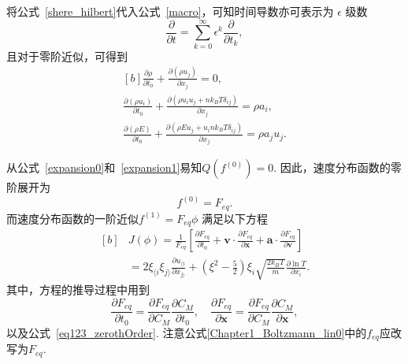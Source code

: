 将公式~\eqref{shere_hilbert}代入公式~\eqref{macro}，可知时间导数亦可表示为 $\epsilon$ 级数~\cite{henning}
\begin{equation}\label{fast_slow_time}
\frac{\partial}{\partial{} t}=\sum_{k=0}^\infty \epsilon^k \frac{\partial}{\partial{} t_k},
\end{equation}
且对于零阶近似，可得到
\begin{equation}\label{eq123_zerothOrder}
\begin{aligned}[b]
\frac{\partial \rho}{\partial t_0}+\frac{\partial(\rho{}u_j) }{\partial x_j}=0, \\
\frac{\partial (\rho{u_i})}{\partial t_0}+\frac{\partial (\rho{}u_iu_j+nk_BT\delta_{ij})}{\partial x_j}= \rho{}a_i,\\
\frac{\partial \left(\rho{}E\right)}{\partial t_0}+\frac{\partial \left(\rho{}{E}u_j+u_ink_BT\delta_{ij}\right)}{\partial x_j}=\rho{}a_ju_j.
\end{aligned}
\end{equation} 

从公式~\eqref{expansion0}和~\eqref{expansion1}易知$Q(f^{(0)})=0$. 因此，速度分布函数的零阶展开为
\begin{equation}
f^{(0)}=F_{eq}.
\end{equation} 
而速度分布函数的一阶近似$f^{(1)}=F_{eq}\phi$ 满足以下方程~\cite{henning}
\begin{equation}\label{integral_solution}
\begin{aligned}[b]
&{J}(\phi)=\frac{1}{F_{eq}}\left[\frac{\partial F_{eq}}{\partial t_0}+\bm{v}\cdot\frac{\partial F_{eq}}{\partial
	\bm{x}}+\bm{a}\cdot\frac{\partial F_{eq}}{\partial \bm{v}} \right]\\
&=
2\xi_{\langle{i}} \xi_{j\rangle}
\frac{\partial u_{\langle i}}{\partial x_{j\rangle}}
+\left(\xi^2-\frac{5}{2}\right)\xi_i\sqrt{\frac{2k_BT}{m}}\frac{\partial \ln{T}}{\partial x_i}.
\end{aligned}
\end{equation}
其中，方程的推导过程中用到
\begin{equation*}
\frac{\partial F_{eq}}{\partial t_0}=
\frac{\partial F_{eq}}{\partial C_M}
\frac{\partial C_M}{\partial t_0}, \quad
\frac{\partial F_{eq}}{\partial \bm{x}}=
\frac{\partial F_{eq}}{\partial C_M}
\frac{\partial C_M}{\partial \bm{x}}, 
\end{equation*} 
以及公式~\eqref{eq123_zerothOrder}. 注意公式\eqref{Chapter1_Boltzmann_lin0}中的$f_{eq}$应改写为$F_{eq}$.


